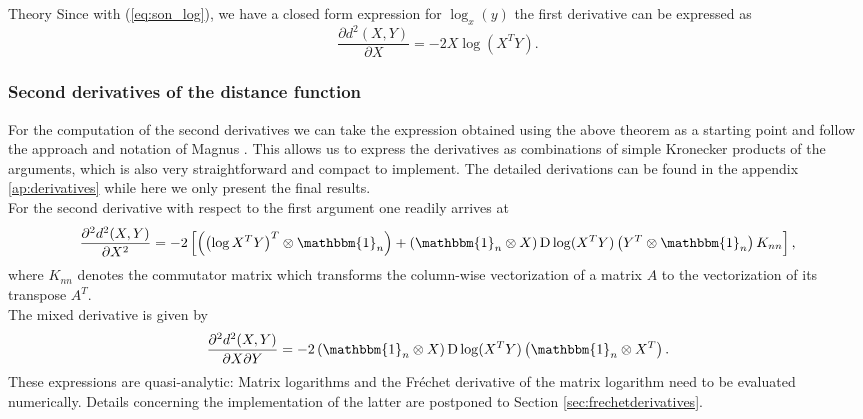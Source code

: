 \begin{chapter}{Theory}
Since with (\ref{eq:son_log}), we have a closed form expression for $\log_x(y)$ the first derivative can be expressed as
\begin{equation}
    \frac{\partial d^2(X,Y)}{\partial X} = -2X\log(X^TY).
\end{equation}

\subsubsection{Second derivatives of the distance function} %
\label{ssub:SecondDerSO}
For the computation of the second derivatives we can take the expression obtained using the above theorem as a starting point and follow the approach and notation of Magnus \cite{Magnus}. 
This allows us to express the derivatives as combinations of simple Kronecker products of the arguments, which is also very straightforward and compact to implement. 
The detailed derivations can be found in the appendix \ref{ap:derivatives} while here we only present the final results. \\
For the second derivative with respect to the first argument one readily arrives at
\begin{equation}
    \label{eq:son_xx_der}
    \frac{\partial^2 d^2(X,Y)}{\partial X^2} = -2\left[\left(\left(\log X^TY\right)^T\otimes\mathbbm{1}_n\right) + \left(\mathbbm{1}_n\otimes X \right)\operatorname{D}\log(X^TY) \left(Y^T\otimes\mathbbm{1}_n \right) K_{nn}\right],
\end{equation}
where $K_{nn}$ denotes the commutator matrix which transforms the column-wise vectorization of a matrix $A$ to the vectorization of its transpose $A^T$.\\

The mixed derivative is given by
\begin{equation}
    \label{eq:son_xy_der}
    \frac{\partial^2 d^2(X,Y)}{\partial X\partial Y} = -2\left(\mathbbm{1}_n\otimes X \right)\operatorname{D}\log(X^TY) \left(\mathbbm{1}_n\otimes X^T \right).
\end{equation}
These expressions are quasi-analytic: Matrix logarithms and the Fr\'{e}chet derivative of the matrix logarithm need to be evaluated numerically. Details concerning the 
implementation of the latter are postponed to Section \ref{sec:frechetderivatives}.


\end{chapter}

